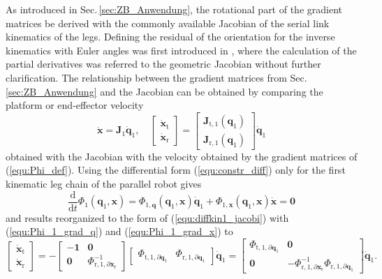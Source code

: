 \documentclass[robotics,article,submit,moreauthors,pdftex]{Definitions/mdpi}
\newcommand{\bm}[1]{\boldsymbol{#1}}
\let\Phi\varPhi
\begin{document}
As introduced in Sec.\,\ref{sec:ZB_Anwendung}, the rotational part of the gradient matrices  be derived with the commonly available Jacobian of the serial link kinematics of the legs.
Defining the residual of the orientation for the inverse kinematics with Euler angles was first introduced in \cite{GoldenbergBenFen1985}, where the calculation of the partial derivatives was referred to the geometric Jacobian without further clarification.
The relationship between the gradient matrices from Sec.\,\ref{sec:ZB_Anwendung} and the Jacobian can be obtained by comparing the platform or end-effector velocity 
%
\begin{equation}
\dot{\bm{x}} = \bm{J}_1 \dot{\bm{q}}_1,
\quad
\begin{bmatrix}
\dot{\bm{x}}_\mathrm{t}\\
\dot{\bm{x}}_\mathrm{r}
\end{bmatrix}
 = 
\begin{bmatrix}
 \bm{J}_{\mathrm{t},1}(\bm{q}_1)\\
 \bm{J}_{\mathrm{r},1}(\bm{q}_1) 
\end{bmatrix}
\dot{\bm{q}}_1
\label{equ:diffkin1_jacobi}
\end{equation}
%
obtained with the Jacobian with the velocity obtained by the gradient matrices of (\ref{equ:Phi_def}).
Using the differential form (\ref{equ:constr_diff}) only for the first kinematic leg chain of the parallel robot gives
%
\begin{equation}
\frac{\mathrm{d}}{\mathrm{d}t} \bm{\Phi}_1(\bm{q}_1,\bm{x})
=
\bm{\Phi}_{1,\bm{q}}(\bm{q}_1,\bm{x}) \dot{\bm{q}}_1 + \bm{\Phi}_{1,\bm{x}}(\bm{q}_1,\bm{x}) \dot{\bm{x}} 
=
\bm{0}
\label{equ:constr_diff1}
\end{equation}
%
and results reorganized to the form of (\ref{equ:diffkin1_jacobi}) with (\ref{equ:Phi_1_grad_q}) and (\ref{equ:Phi_1_grad_x}) to
%
\begin{equation}
\begin{bmatrix}
\dot{\bm{x}}_\mathrm{t}\\
\dot{\bm{x}}_\mathrm{r}
\end{bmatrix}
=
-
\begin{bmatrix}
-\bm{1} & \bm{0} \\
\bm{0} & \bm{\Phi}_{\mathrm{r},1,\partial\bm{x}_\mathrm{r}}^{-1}
\end{bmatrix}
\begin{bmatrix}
\bm{\Phi}_{\mathrm{t},1,\partial\bm{q}_1}
&
\bm{\Phi}_{\mathrm{r},1,\partial\bm{q}_1}
\end{bmatrix}
\dot{\bm{q}}_1
=
\begin{bmatrix}
\bm{\Phi}_{\mathrm{t},1,\partial\bm{q}_1} & \bm{0} \\
\bm{0} & -\bm{\Phi}_{\mathrm{r},1,\partial\bm{x}_\mathrm{r}}^{-1} \bm{\Phi}_{\mathrm{r},1,\partial\bm{q}_1}
\end{bmatrix}
\dot{\bm{q}}_1.
\label{equ:diffkin1_gradmat}
\end{equation}
\end{document}
